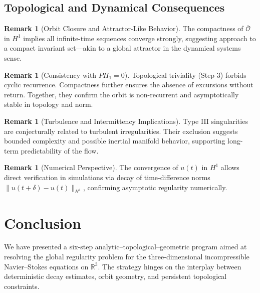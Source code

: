 \documentclass[11pt]{article}
\theoremstyle{definition}
\newtheorem{remark}[theorem]{Remark}
\begin{document}
\subsection*{Topological and Dynamical Consequences}
\begin{remark}[Orbit Closure and Attractor-Like Behavior]
The compactness of $\overline{\mathcal{O}}$ in $H^1$ implies all infinite-time sequences converge strongly, suggesting approach to a compact invariant set—akin to a global attractor in the dynamical systems sense.
\end{remark}

\begin{remark}[Consistency with $PH_1 = 0$]
Topological triviality (Step 3) forbids cyclic recurrence. Compactness further ensures the absence of excursions without return. Together, they confirm the orbit is non-recurrent and asymptotically stable in topology and norm.
\end{remark}

\begin{remark}[Turbulence and Intermittency Implications]
Type III singularities are conjecturally related to turbulent irregularities. Their exclusion suggests bounded complexity and possible inertial manifold behavior, supporting long-term predictability of the flow.
\end{remark}

\begin{remark}[Numerical Perspective]
The convergence of $u(t)$ in $H^1$ allows direct verification in simulations via decay of time-difference norms $\|u(t+\delta) - u(t)\|_{H^1}$, confirming asymptotic regularity numerically.
\end{remark}


\section{Conclusion}
\label{sec:conclusion}

We have presented a six-step analytic–topological–geometric program aimed at resolving the global regularity problem for the three-dimensional incompressible Navier–Stokes equations on \( \mathbb{R}^3 \). The strategy hinges on the interplay between deterministic decay estimates, orbit geometry, and persistent topological constraints.
\end{document}

